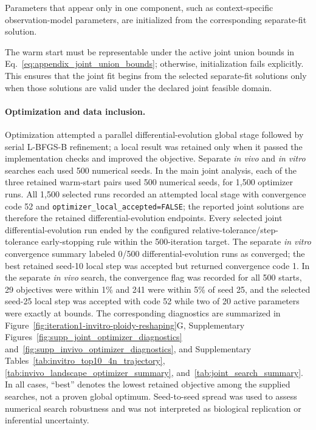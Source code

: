 \documentclass[11pt]{article}
\begin{document}
Parameters that appear only in one component, such as context-specific observation-model parameters, are initialized from the corresponding separate-fit solution.

The warm start must be representable under the active joint union bounds in Eq.~\eqref{eq:appendix_joint_union_bounds}; otherwise, initialization fails explicitly. This ensures that the joint fit begins from the selected separate-fit solutions only when those solutions are valid under the declared joint feasible domain.


\paragraph{Optimization and data inclusion.}

Optimization attempted a parallel differential-evolution global stage followed by serial L-BFGS-B refinement; a local result was retained only when it passed the implementation checks and improved the objective. Separate \textit{in vivo} and \textit{in vitro} searches each used 500 numerical seeds. In the main joint analysis, each of the three retained warm-start pairs used 500 numerical seeds, for 1,500 optimizer runs. All 1,500 selected runs recorded an attempted local stage with convergence code 52 and \texttt{optimizer\_local\_accepted=FALSE}; the reported joint solutions are therefore the retained differential-evolution endpoints. Every selected joint differential-evolution run ended by the configured relative-tolerance/step-tolerance early-stopping rule within the 500-iteration target. The separate \textit{in vitro} convergence summary labeled 0/500 differential-evolution runs as converged; the best retained seed-10 local step was accepted but returned convergence code 1. In the separate \textit{in vivo} search, the convergence flag was recorded for all 500 starts, 29 objectives were within 1\% and 241 were within 5\% of seed 25, and the selected seed-25 local step was accepted with code 52 while two of 20 active parameters were exactly at bounds. The corresponding diagnostics are summarized in Figure~\ref{fig:iteration1-invitro-ploidy-reshaping}G, Supplementary Figures~\ref{fig:supp_joint_optimizer_diagnostics} and~\ref{fig:supp_invivo_optimizer_diagnostics}, and Supplementary Tables~\ref{tab:invitro_top10_4n_trajectory}, \ref{tab:invivo_landscape_optimizer_summary}, and~\ref{tab:joint_search_summary}. In all cases, ``best'' denotes the lowest retained objective among the supplied searches, not a proven global optimum. Seed-to-seed spread was used to assess numerical search robustness and was not interpreted as biological replication or inferential uncertainty.
\end{document}
